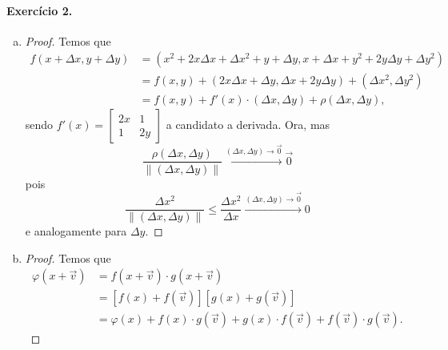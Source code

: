 \documentclass[12pt,a4paper]{article}
\begin{document}
\paragraph{Exercício 2.}
%
    \begin{enumerate}[a)]
        \item 
        \begin{proof}
            Temos que
            \begin{align*}
                f(x+\Delta x, y+\Delta y) &= (x^2 + 2x\Delta x + \Delta x^2 + y + \Delta y,
                                                x + \Delta x + y^2 + 2y\Delta y + \Delta y^2) \\
                                          &= f(x,y) + (2x\Delta x + \Delta y, \Delta x + 2y\Delta y)
                                          + (\Delta x^2, \Delta y^2) \\
                                          &= f(x,y)+f'(x)\cdot (\Delta x, \Delta y)+\rho(\Delta x, \Delta y),
            \end{align*}
            sendo $f'(x) = \begin{bmatrix} 2x & 1 \\ 1 & 2y \end{bmatrix}$ a candidato a derivada. Ora, mas
            \begin{equation*}
                \frac{\rho(\Delta x, \Delta y)}{\|(\Delta x, \Delta y)\|} 
                \xrightarrow{(\Delta x, \Delta y)\to\vec{0}} \vec{0}
            \end{equation*}
            pois
            \begin{equation*}
                \frac{\Delta x^2}{\|(\Delta x, \Delta y)\|} \leq \frac{\Delta x^2}{\Delta x}
                \xrightarrow{(\Delta x, \Delta y)\to\vec{0}} 0
            \end{equation*}
            e analogamente para $\Delta y$.
        \end{proof}
        \item
        \begin{proof}
            Temos que
            \begin{align*}
                \varphi(x+\vec{v}) &= f(x+\vec{v})\cdot g(x+\vec{v}) \\
                                   &= [f(x) + f(\vec{v})][g(x) + g(\vec{v})] \\
                                   &= \varphi(x) + f(x)\cdot g(\vec{v}) + g(x)\cdot f(\vec{v}) + f(\vec{v})\cdot g(\vec{v}).

\end{align*}
\end{proof}
\end{enumerate}
\end{document}

